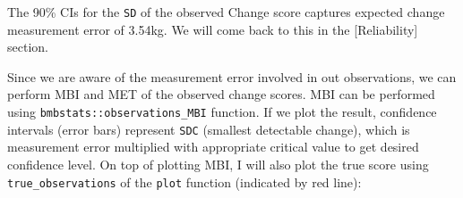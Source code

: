 \documentclass[
]{book}
\newenvironment{Shaded}{\begin{snugshade}}{\end{snugshade}}
\newcommand{\CommentTok}[1]{\textcolor[rgb]{0.56,0.35,0.01}{\textit{#1}}}
\newcommand{\DataTypeTok}[1]{\textcolor[rgb]{0.13,0.29,0.53}{#1}}
\newcommand{\DecValTok}[1]{\textcolor[rgb]{0.00,0.00,0.81}{#1}}
\newcommand{\FloatTok}[1]{\textcolor[rgb]{0.00,0.00,0.81}{#1}}
\newcommand{\KeywordTok}[1]{\textcolor[rgb]{0.13,0.29,0.53}{\textbf{#1}}}
\newcommand{\NormalTok}[1]{#1}
\newcommand{\OperatorTok}[1]{\textcolor[rgb]{0.81,0.36,0.00}{\textbf{#1}}}
\newcommand{\StringTok}[1]{\textcolor[rgb]{0.31,0.60,0.02}{#1}}
\begin{document}
\begin{Shaded}
\end{Shaded}

The 90\% CIs for the \texttt{SD} of the observed Change score captures expected change measurement error of 3.54kg. We will come back to this in the {[}Reliability{]} section.

Since we are aware of the measurement error involved in out observations, we can perform MBI and MET of the observed change scores. MBI can be performed using \texttt{bmbstats::observations\_MBI} function. If we plot the result, confidence intervals (error bars) represent \texttt{SDC} (smallest detectable change), which is measurement error multiplied with appropriate critical value to get desired confidence level. On top of plotting MBI, I will also plot the true score using \texttt{true\_observations} of the \texttt{plot} function (indicated by red line):
\end{document}
